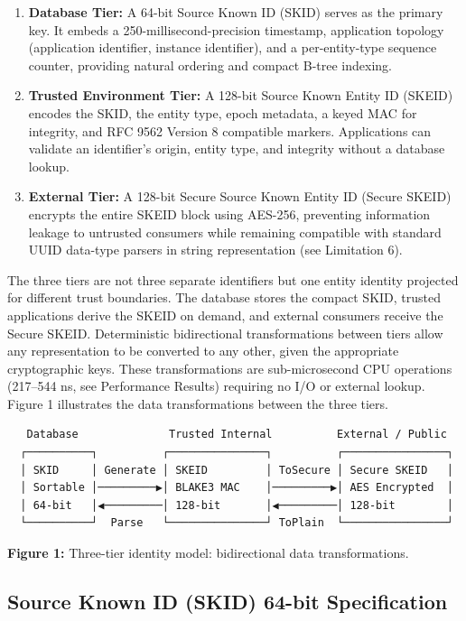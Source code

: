 \documentclass[fleqn,10pt,lineno]{wlpeerj}
\begin{document}
\begin{enumerate}
\def\labelenumi{\arabic{enumi}.}
\item
  \textbf{Database Tier:} A 64-bit Source Known ID (SKID) serves as the
  primary key. It embeds a 250-millisecond-precision timestamp,
  application topology (application identifier, instance identifier),
  and a per-entity-type sequence counter, providing natural ordering and
  compact B-tree indexing.
\item
  \textbf{Trusted Environment Tier:} A 128-bit Source Known Entity ID
  (SKEID) encodes the SKID, the entity type, epoch metadata, a keyed MAC
  for integrity, and RFC 9562 Version 8 compatible markers. Applications
  can validate an identifier's origin, entity type, and integrity
  without a database lookup.
\item
  \textbf{External Tier:} A 128-bit Secure Source Known Entity ID
  (Secure SKEID) encrypts the entire SKEID block using AES-256,
  preventing information leakage to untrusted consumers while remaining
  compatible with standard UUID data-type parsers in string
  representation (see Limitation 6).
\end{enumerate}

The three tiers are not three separate identifiers but one entity
identity projected for different trust boundaries. The database stores
the compact SKID, trusted applications derive the SKEID on demand, and
external consumers receive the Secure SKEID. Deterministic bidirectional
transformations between tiers allow any representation to be converted
to any other, given the appropriate cryptographic keys. These
transformations are sub-microsecond CPU operations (217--544 ns, see
Performance Results) requiring no I/O or external lookup. Figure 1
illustrates the data transformations between the three tiers.

\begin{verbatim}
   Database              Trusted Internal          External / Public
  ┌──────────┐          ┌───────────────┐          ┌────────────────┐
  │ SKID     │ Generate │ SKEID         │ ToSecure │ Secure SKEID   │
  │ Sortable │─────────▶│ BLAKE3 MAC    │─────────▶│ AES Encrypted  │
  │ 64-bit   │◀─────────│ 128-bit       │◀─────────│ 128-bit        │
  └──────────┘  Parse   └───────────────┘ ToPlain  └────────────────┘
\end{verbatim}

\textbf{Figure 1:} Three-tier identity model: bidirectional data
transformations.

\subsection{Source Known ID (SKID) 64-bit
Specification}\label{source-known-id-skid-64-bit-specification}
\end{document}
